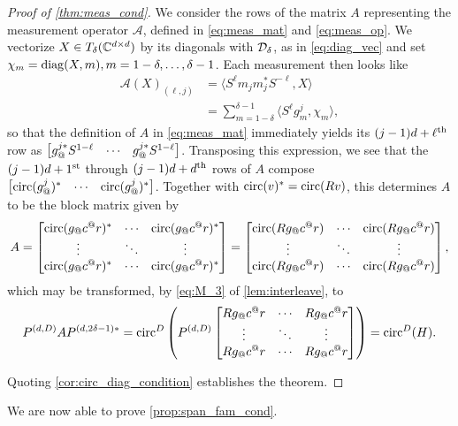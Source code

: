 \begin{proof}[Proof of \cref{thm:meas_cond}]
  We consider the rows of the matrix $A$ representing the measurement operator $\mathcal{A}$, defined in \eqref{eq:meas_mat} and \eqref{eq:meas_op}.  We vectorize $X \in T_\delta(\mathbb{C}^{d \times d})$ by its diagonals with $\mathcal{D}_\delta$, as in \eqref{eq:diag_vec} and set $\chi_m = \operatorname{diag}(X, m), m = 1 - \delta, \ldots, \delta - 1$.  Each measurement then looks like
  \begin{align*}
    \mathcal{A}(X)_{(\ell, j)} &= \langle S^{\ell} m_j m_j^* S^{-\ell}, X \rangle \\
    &= \sum_{m = 1 - \delta}^{\delta - 1} \langle S^{\ell} g_m^j, \chi_m \rangle,
  \end{align*}
  so that the definition of $A$ in \eqref{eq:meas_mat} immediately yields its $(j - 1) d + \ell^{\text{th}}$ row as $\rowmatfun{g_@^{j*} S^{1 - \ell}}{1 - \delta}{\delta - 1}$.  Transposing this expression, we see that the $(j - 1)d + 1^{\text{st}}$ through $(j - 1) d + d^{\text{th}}$ rows of $A$ compose $\rowmatfun{\circop(g^j_@)^*}{1 - \delta}{\delta - 1}$. %
  Together with $\operatorname{circ}(v)^* = \operatorname{circ}(Rv)$, this determines $A$ to be the block matrix given by \[A = \cornmatfun{\circop(g_@c^@r)^*}{1}{D}{1 - \delta}{\delta - 1} = \cornmatfun{\circop(R g_@c^@r)}{1}{D}{1 - \delta}{\delta - 1},\] which may be transformed, by \eqref{eq:M_3} of \cref{lem:interleave}, to
  \begin{equation}
    P^{(d, D)} A P^{(d, 2 \delta - 1)*} = \circop^D\left(P^{(d, D)} \cornmatfun{R g_@c^@r}{1}{D}{1 - \delta}{\delta - 1} \right) = \circop^D(H).
    \label{eq:interleaved_meas}
  \end{equation}

Quoting \cref{cor:circ_diag_condition} establishes the theorem.
\end{proof}

We are now able to prove \cref{prop:span_fam_cond}.

